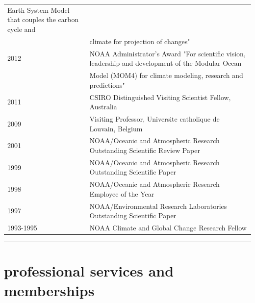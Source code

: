 \documentclass{article}
\begin{document}
\begin{tabular}{ll}
  Earth System Model  
  that couples the carbon cycle and \\ & climate for projection of changes" \\
  2012 & NOAA Administrator's Award "For scientific vision, leadership
  and development of 
  the Modular Ocean \\ & Model (MOM4) for climate modeling, research and
  predictions" \\
  2011 & CSIRO Distinguished Visiting Scientist Fellow, Australia \\
  2009 & Visiting Professor, Universite catholique de Louvain, Belgium\\
  2001 & NOAA/Oceanic and Atmospheric Research Outstanding Scientific
  Review Paper\\
  1999 & NOAA/Oceanic and Atmospheric Research Outstanding Scientific Paper\\
  1998 & NOAA/Oceanic and Atmospheric Research Employee of the Year\\
  1997 & NOAA/Environmental Research Laboratories Outstanding Scientific Paper\\
  1993-1995 & NOAA Climate and Global Change Research Fellow
\end{tabular}


\noindent\rule{\textwidth}{1pt}
\vspace{-1cm}
\section*{\sc  \color{Maroon}  professional services and memberships}
\vspace{-.25cm}
\end{document}
